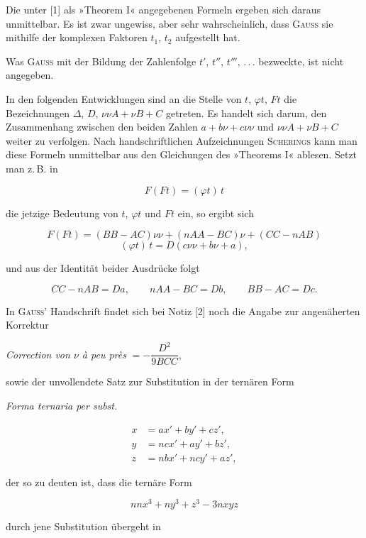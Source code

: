 \noindent\hspace*{\parindent}Die unter [1] als »Theorem I« angegebenen Formeln ergeben sich daraus unmittelbar.
Es ist zwar ungewiss, aber sehr wahrscheinlich, dass
\textsc{Gauss} sie mithilfe der komplexen Faktoren $t_1$, $t_2$
aufgestellt hat.

Was \textsc{Gauss} mit der Bildung der Zahlenfolge $t'$, $t''$, $t'''$,
.\,.\,. bezweckte, ist nicht angegeben.

In den folgenden Entwicklungen sind an die Stelle von $t$, $\varphi t$,
$Ft$ die Bezeichnungen $\Delta$, $D$, $\nu\nu A+\nu B+C$ getreten. Es handelt
sich darum, den Zusammenhang zwischen den beiden Zahlen $a+b\nu+c\nu\nu$ und
$\nu\nu A+\nu B+C$ weiter zu verfolgen. Nach handschriftlichen Aufzeichnungen
\textsc{Scherings} kann man diese Formeln unmittelbar aus den Gleichungen des
»Theorems I« ablesen. Setzt man z.\,B. in

\[
F(Ft) = (\varphi t)\,t
\]

\noindent die jetzige Bedeutung von $t$, $\varphi t$ und $Ft$ ein, so ergibt sich

\[
F(Ft) = (BB-AC)\nu\nu + (nAA-BC)\nu + (CC-nAB)
\]
\[
(\varphi t)\,t = D(c\nu\nu+b\nu+a),
\]

\noindent und aus der Identität beider Ausdrücke folgt

\[
CC-nAB = Da, \qquad nAA-BC = Db, \qquad BB-AC = Dc.
\]

In \textsc{Gauss}' Handschrift findet sich bei Notiz [2] noch die Angabe zur angenäherten Korrektur

\begin{center}\textit{Correction von $\nu$ à peu près} $= -\dfrac{D^2}{9BCC},$\end{center}

\noindent sowie der unvollendete Satz zur Substitution in der ternären Form

\begin{center}\textit{Forma ternaria per subst.}\end{center}
\[
\begin{aligned}
x &= ax'+by'+cz', \\
y &= ncx'+ay'+bz', \\
z &= nbx'+ncy'+az',
\end{aligned}
\]

\noindent der so zu deuten ist, dass die ternäre Form

\[
nnx^3+ny^3+z^3-3nxyz
\]

\noindent durch jene Substitution übergeht in

